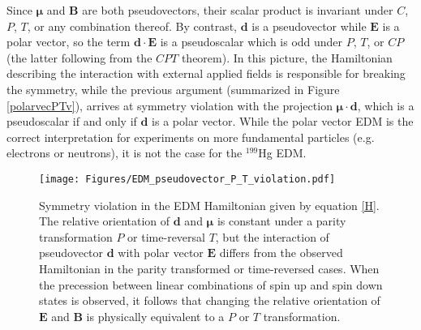 \documentclass [10pt, twoside] {uwthesis}[2012/04/02]
\begin{document}
Since $\boldsymbol\mu$ and $\mathbf{B}$ are both pseudovectors, their scalar product is invariant under $C$, $P$, $T$, or any combination thereof. By contrast, $\mathbf{d}$ is a pseudovector while $\mathbf{E}$ is a polar vector, so the term $\mathbf{d}\cdot\mathbf{E}$ is a pseudoscalar which is odd under $P$, $T$, or $CP$ (the latter following from the $CPT$ theorem). In this picture, the Hamiltonian describing the interaction with external applied fields is responsible for breaking the symmetry, while the previous argument (summarized in Figure \ref{polarvecPTv}), arrives at symmetry violation with the projection $\boldsymbol\mu\cdot\mathbf{d}$, which is a pseudoscalar if and only if $\mathbf{d}$ is a polar vector. While the polar vector EDM is the correct interpretation for experiments on more fundamental particles (e.g. electrons or neutrons), it is not the case for the $^{199}$Hg EDM.
\begin{figure}
\begin{center}
\texttt{[image: Figures/EDM\_pseudovector\_P\_T\_violation.pdf]}
\end{center}
\caption[Parity and Time-reversal symmetry violation with a pseudovector EDM]%
{\narrower Symmetry violation in the EDM Hamiltonian given by equation \eqref{H}. The relative orientation of $\mathbf{d}$ and $\boldsymbol{\mu}$ is constant under a parity transformation $P$ or time-reversal $T$, but the interaction of pseudovector $\mathbf{d}$ with polar vector $\mathbf{E}$ differs from the observed Hamiltonian in the parity transformed or time-reversed cases. When the precession between linear combinations of spin up and spin down states is observed, it follows that changing the relative orientation of $\mathbf{E}$ and $\mathbf{B}$ is physically equivalent to a $P$ or $T$ transformation.}
\label{pseudovecPTv}
\end{figure}
\end{document}
